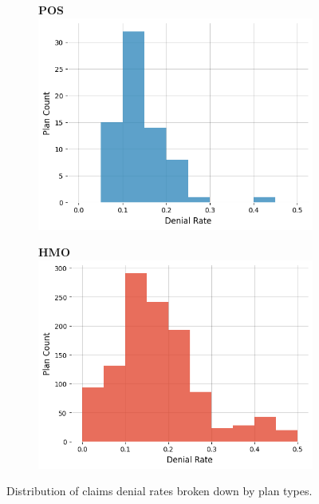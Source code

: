 \documentclass[12pt, a4paper,twoside]{report}
\theoremstyle{plain} %
\theoremstyle{definition} %
\theoremstyle{remark} %
\numberwithin{equation}{chapter}
\begin{document}
\begin{figure}
					\vspace{1em}
					\begin{subfigure}[t]{0.49\textwidth}
						\centering
						\textbf{POS}
						\includegraphics[width=\textwidth]{images/cms_puf/POS_dist.png}
					\end{subfigure}
					\hfill
					\begin{subfigure}[t]{0.49\textwidth}
						\centering
						\textbf{HMO}
						\includegraphics[width=\textwidth]{images/cms_puf/HMO_dist.png}
					\end{subfigure}
				
					\caption{Distribution of claims denial rates broken down by plan types.}
					\label{federaldenialratesbyplantype}
			\end{figure}
		
\end{document}
